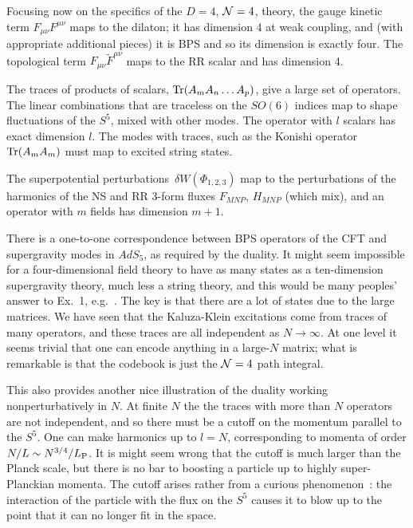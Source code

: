 \documentclass[12pt]{article}
\begin{document}
{Focusing now on the specifics of the $D=4$, ${\cal N} = 4$, theory,
the gauge kinetic term $F_{\mu\nu}F^{\mu\nu}$ maps to the dilaton; it has dimension 4 at weak coupling, and (with appropriate additional pieces) it is BPS and so its dimension is exactly four. The topological term $F_{\mu\nu} \tilde F^{\mu\nu}$ maps to the RR scalar and has dimension 4.

The traces of products of scalars, ${\rm Tr} (A_m A_n \ldots A_p)$, give a large set of operators.  The linear combinations that are traceless on the $SO(6)$ indices map to shape fluctuations of the $S^5$, mixed with other modes.  The operator with $l$ scalars has exact dimension $l$.  The modes with traces, such as the Konishi operator ${\rm Tr} (A_m A_m)$ must map to excited string states. 

The superpotential perturbations~$\delta W(\Phi_{1,2,3})$ map to the perturbations of the harmonics of the NS and RR 3-form fluxes $F_{MNP}$, $H_{MNP}$ (which mix), and an operator with $m$ fields has dimension $m+1$.

There is a one-to-one correspondence between BPS operators of the CFT and supergravity modes in $AdS_5$, as required by the duality.  It might seem impossible for a four-dimensional field theory to have as many states as a ten-dimension supergravity theory, much less a string theory, and this would be many peoples' answer to Ex.~1, e.g.~\cite{Penrose}.  The key is that there are a lot of states due to the large matrices.  We have seen that the Kaluza-Klein excitations come from traces of many operators, and these traces are all independent as $N \to \infty$.  At one level it seems trivial that one can encode anything in a large-$N$ matrix; what is remarkable is that the codebook is just the ${\cal N} = 4$ path integral.

This also provides another nice illustration of the duality working nonperturbatively in $N$.  At finite $N$ the the traces with more than $N$ operators are not independent, and so there must be a cutoff on the momentum parallel to the $S^5$.  One can make harmonics up to $l = N$, corresponding to momenta of order $N/L \sim N^{3/4}/L_{\rm P}$.  It is might seem wrong that the cutoff is much larger than the Planck scale, but there is no bar to boosting a particle up to highly super-Planckian momenta.  The cutoff arises rather from a curious phenomenon~\cite{McGreevy:2000cw}: the interaction of the particle with the flux on the $S^5$  causes it to blow up to the point that it can no longer fit in the space.

}
\end{document}

